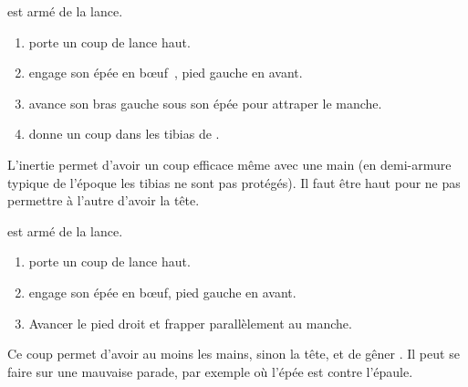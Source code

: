\begin{technique}

\A est armé de la lance.

\begin{enumerate}
	\item \A porte un coup de lance haut.
	
	\item \D engage son épée en bœuf~\footnotemark, pied gauche en avant.
	
	\item \D avance son bras gauche sous son épée pour attraper le manche.
	
	\item \D donne un coup dans les tibias de \A.
\end{enumerate}

L'inertie permet d'avoir un coup efficace même avec une main (en demi-armure typique de l'époque les tibias ne sont pas protégés).
Il faut être haut pour ne pas permettre à l'autre d'avoir la tête.

\end{technique}


\begin{technique}

\A est armé de la lance.

\begin{enumerate}
	\item \A porte un coup de lance haut.
	
	\item \D engage son épée en bœuf, pied gauche en avant.
	
	\item Avancer le pied droit et frapper parallèlement au manche. 
\end{enumerate}

Ce coup permet d'avoir au moins les mains, sinon la tête, et de gêner \A.
Il peut se faire sur une mauvaise parade, par exemple où l'épée est contre l'épaule.

\end{technique}


